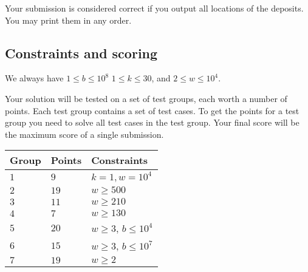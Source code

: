 Your submission is considered correct if you output all locations of the deposits.
You may print them in any order.

\subsection*{Constraints and scoring}

We always have 
$1\leq b \leq 10^8$ %
$1 \leq k \leq 30$, %
and
$2 \le w \le 10^4$. %

Your solution will be tested on a set of test groups, each worth a number of points.
Each test group contains a set of test cases.
To get the points for a test group you need to solve all test cases in the test group.
Your final score will be the maximum score of a single submission.

\medskip
\begin{tabular}{lll}
Group & Points & Constraints \\\hline
  $1$ & $9$ & $k = 1, w = 10^4$\\
  $2$ & $19$ & $w \ge 500$\\
  $3$ & $11$ & $w \ge 210$\\
  $4$ & $7$ & $w \ge 130$\\
  $5$ & $20$ & $w \ge 3$, $b \le 10^4$\\
  $6$ & $15$ & $w \ge 3$, $b \le 10^7$\\
  $7$ & $19$ & $w \ge 2$
\end{tabular}

